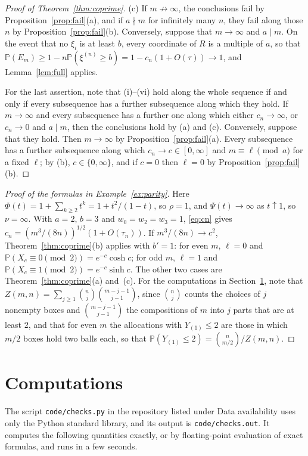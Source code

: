 \documentclass[11pt]{amsart}
\theoremstyle{definition}
\theoremstyle{remark}
\numberwithin{equation}{section}
\newcommand{\Pp}{\mathbb P}
\begin{document}
\begin{proof}[Proof of Theorem~\ref{thm:coprime}]
(c) If $m\not\to\infty$, the conclusions fail by Proposition~\ref{prop:fail}(a), and if $a\nmid m$ for infinitely many $n$, they fail along those $n$ by Proposition~\ref{prop:fail}(b). Conversely, suppose that $m\to\infty$ and $a\mid m$. On the event that no $\xi_i$ is at least $b$, every coordinate of $R$ is a multiple of $a$, so that $\Pp(E_m)\ge1-n\Pp(\xi^{(n)}\ge b)=1-c_n(1+O(\tau))\to1$, and Lemma~\ref{lem:full} applies.

For the last assertion, note that (i)--(vi) hold along the whole sequence if and only if every subsequence has a further subsequence along which they hold. If $m\to\infty$ and every subsequence has a further one along which either $c_n\to\infty$, or $c_n\to0$ and $a\mid m$, then the conclusions hold by (a) and (c). Conversely, suppose that they hold. Then $m\to\infty$ by Proposition~\ref{prop:fail}(a). Every subsequence has a further subsequence along which $c_n\to c\in[0,\infty]$ and $m\equiv\ell\pmod a$ for a fixed $\ell$; by (b), $c\in\{0,\infty\}$, and if $c=0$ then $\ell=0$ by Proposition~\ref{prop:fail}(b).
\end{proof}

\begin{proof}[Proof of the formulas in Example~\ref{ex:parity}]
Here $\Phi(t)=1+\sum_{k\ge2}t^k=1+t^2/(1-t)$, so $\rho=1$, and $\Psi(t)\to\infty$ as $t\uparrow1$, so $\nu=\infty$. With $a=2$, $b=3$ and $w_0=w_2=w_3=1$, \eqref{eq:cn} gives $c_n=(m^3/(8n))^{1/2}(1+O(\tau_n))$. If $m^3/(8n)\to c^2$, Theorem~\ref{thm:coprime}(b) applies with $b'=1$: for even $m$, $\ell=0$ and $\Pp(X_c\equiv0\pmod2)=e^{-c}\cosh c$; for odd $m$, $\ell=1$ and $\Pp(X_c\equiv1\pmod2)=e^{-c}\sinh c$. The other two cases are Theorem~\ref{thm:coprime}(a) and~(c). For the computations in Section~\ref{sec:checks}, note that $Z(m,n)=\sum_{j\ge1}\binom nj\binom{m-j-1}{j-1}$, since $\binom nj$ counts the choices of $j$ nonempty boxes and $\binom{m-j-1}{j-1}$ the compositions of $m$ into $j$ parts that are at least $2$, and that for even $m$ the allocations with $Y_{(1)}\le2$ are those in which $m/2$ boxes hold two balls each, so that $\Pp(Y_{(1)}\le2)=\binom n{m/2}/Z(m,n)$.
\end{proof}

\section{Computations}\label{sec:checks}

The script \texttt{code/checks.py} in the repository listed under Data availability uses only the Python standard library, and its output is \texttt{code/checks.out}. It computes the following quantities exactly, or by floating-point evaluation of exact formulas, and runs in a few seconds.
\end{document}
